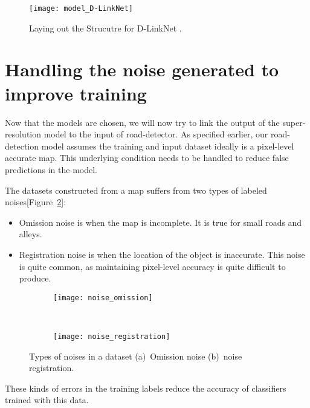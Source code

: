 \begin{figure}[t]
  \centering
  \texttt{[image: model\_D-LinkNet]}
  \caption{Laying out the Strucutre for D-LinkNet \cite{D-LinkNet}.}
  \label{fig:model_D-LinkNet}
\end{figure}


\section{Handling the noise generated to improve training}
Now that the models are chosen, we will now try to link the output of the super-resolution model to the input of road-detector. As specified earlier, our road-detection model assumes the training and input dataset ideally is a pixel-level accurate map. This underlying condition needs to be handled to reduce false predictions in the model. \par

The datasets constructed from a map suffers from two types of labeled noises[Figure~\ref{fig:noise_types}]:
\begin{itemize}
  \item Omission noise is when the map is incomplete. It is true for small roads and alleys.
  \item Registration noise is when the location of the object is inaccurate. This noise is quite common, as maintaining pixel-level accuracy is quite difficult to produce.
\end{itemize}

\begin{figure}
  \centering
  \begin{subfigure}{0.5\textwidth}
    \texttt{[image: noise\_omission]}
    \caption{}
  \end{subfigure}~
  \begin{subfigure}{0.5\textwidth}
    \texttt{[image: noise\_registration]}
    \caption{}
  \end{subfigure}
  \caption[Types of noises in a dataset]{Types of noises in a dataset (a)~Omission noise (b)~noise registration.}%
  \label{fig:noise_types}%
\end{figure}

These kinds of errors in the training labels reduce the accuracy of classifiers trained with this data. 


